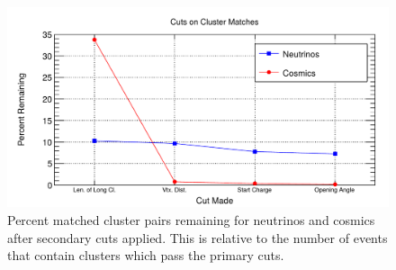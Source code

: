 \begin{figure}[htp!]
\centering
\includegraphics[width=\textwidth]{figs/2dsecondarycut.png}
\caption{Percent matched cluster pairs remaining for neutrinos and cosmics after secondary cuts applied. This is relative to the number of events that contain clusters which pass the primary cuts.}
\label{fig:2dsecondarycuts}
\end{figure}
